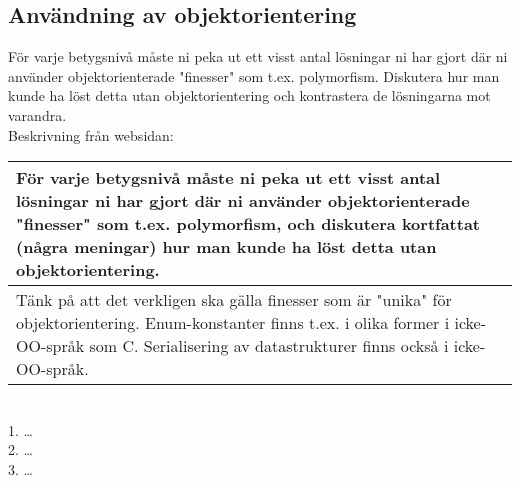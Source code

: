 \subsection{Användning av objektorientering}
För varje betygsnivå måste ni peka ut ett visst antal lösningar ni har gjort där ni använder objektorienterade "finesser" som t.ex. polymorfism.  Diskutera hur man kunde ha löst detta utan objektorientering och kontrastera de lösningarna mot varandra. \\
Beskrivning från websidan:\\
\begin{tabular}{| p{11cm} |}
    \hline
    För varje betygsnivå måste ni peka ut ett visst antal lösningar ni har gjort där ni använder objektorienterade "finesser" som t.ex. polymorfism, och diskutera kortfattat (några meningar) hur man kunde ha löst detta utan objektorientering. \\ \hline
    Tänk på att det verkligen ska gälla finesser som är "unika" för objektorientering. Enum-konstanter finns t.ex. i olika former i icke-OO-språk som C. Serialisering av datastrukturer finns också i icke-OO-språk. \\ \hline
\end{tabular}\\\vspace{11pt}
1. \ldots\\
2. \ldots\\
3. \ldots\\
